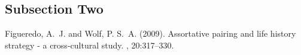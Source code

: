 \documentclass[twoside,twocolumn]{article}
\begin{document}
\subsection{Subsection Two}

\blindtext %


\begin{thebibliography}{99} %

Figueredo, A.~J. and Wolf, P. S.~A. (2009).
\newblock Assortative pairing and life history strategy - a cross-cultural
  study.
, 20:317--330.
 
\end{thebibliography}

\end{document}
